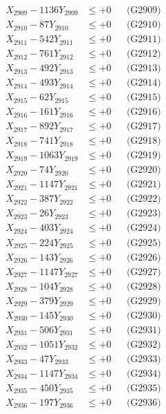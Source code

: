 \documentclass[a4paper,10pt]{article}
\begin{document}
{\begin{align}
X_{2909} - 1136Y_{2909} &\leq +0 && \text{(G2909)} \\
X_{2910} - 87Y_{2910} &\leq +0 && \text{(G2910)} \\
\allowbreak
X_{2911} - 542Y_{2911} &\leq +0 && \text{(G2911)} \\
X_{2912} - 761Y_{2912} &\leq +0 && \text{(G2912)} \\
X_{2913} - 492Y_{2913} &\leq +0 && \text{(G2913)} \\
X_{2914} - 493Y_{2914} &\leq +0 && \text{(G2914)} \\
X_{2915} - 62Y_{2915} &\leq +0 && \text{(G2915)} \\
X_{2916} - 161Y_{2916} &\leq +0 && \text{(G2916)} \\
X_{2917} - 892Y_{2917} &\leq +0 && \text{(G2917)} \\
X_{2918} - 741Y_{2918} &\leq +0 && \text{(G2918)} \\
X_{2919} - 1063Y_{2919} &\leq +0 && \text{(G2919)} \\
X_{2920} - 74Y_{2920} &\leq +0 && \text{(G2920)} \\
\allowbreak
X_{2921} - 1147Y_{2921} &\leq +0 && \text{(G2921)} \\
X_{2922} - 387Y_{2922} &\leq +0 && \text{(G2922)} \\
X_{2923} - 26Y_{2923} &\leq +0 && \text{(G2923)} \\
X_{2924} - 403Y_{2924} &\leq +0 && \text{(G2924)} \\
X_{2925} - 224Y_{2925} &\leq +0 && \text{(G2925)} \\
X_{2926} - 143Y_{2926} &\leq +0 && \text{(G2926)} \\
X_{2927} - 1147Y_{2927} &\leq +0 && \text{(G2927)} \\
X_{2928} - 104Y_{2928} &\leq +0 && \text{(G2928)} \\
X_{2929} - 379Y_{2929} &\leq +0 && \text{(G2929)} \\
X_{2930} - 145Y_{2930} &\leq +0 && \text{(G2930)} \\
\allowbreak
X_{2931} - 506Y_{2931} &\leq +0 && \text{(G2931)} \\
X_{2932} - 1051Y_{2932} &\leq +0 && \text{(G2932)} \\
X_{2933} - 47Y_{2933} &\leq +0 && \text{(G2933)} \\
X_{2934} - 1147Y_{2934} &\leq +0 && \text{(G2934)} \\
X_{2935} - 450Y_{2935} &\leq +0 && \text{(G2935)} \\
X_{2936} - 197Y_{2936} &\leq +0 && \text{(G2936)} \\

\end{align}}
\end{document}
